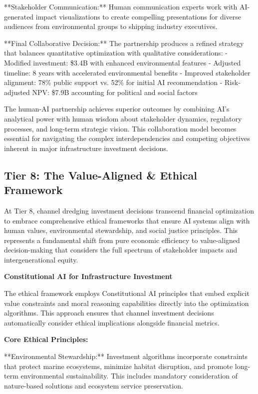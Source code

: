 \documentclass{article}
\begin{document}
**Stakeholder Communication:** Human communication experts work with AI-generated impact visualizations to create compelling presentations for diverse audiences from environmental groups to shipping industry executives.

**Final Collaborative Decision:**
The partnership produces a refined strategy that balances quantitative optimization with qualitative considerations:
- Modified investment: \$3.4B with enhanced environmental features
- Adjusted timeline: 8 years with accelerated environmental benefits
- Improved stakeholder alignment: 78\% public support vs. 52\% for initial AI recommendation
- Risk-adjusted NPV: \$7.9B accounting for political and social factors

The human-AI partnership achieves superior outcomes by combining AI's analytical power with human wisdom about stakeholder dynamics, regulatory processes, and long-term strategic vision. This collaboration model becomes essential for navigating the complex interdependencies and competing objectives inherent in major infrastructure investment decisions.

\subsection{Tier 8: The Value-Aligned \& Ethical Framework}

At Tier 8, channel dredging investment decisions transcend financial optimization to embrace comprehensive ethical frameworks that ensure AI systems align with human values, environmental stewardship, and social justice principles. This represents a fundamental shift from pure economic efficiency to value-aligned decision-making that considers the full spectrum of stakeholder impacts and intergenerational equity.

\textbf{Constitutional AI for Infrastructure Investment}

The ethical framework employs Constitutional AI principles that embed explicit value constraints and moral reasoning capabilities directly into the optimization algorithms. This approach ensures that channel investment decisions automatically consider ethical implications alongside financial metrics.

\textbf{Core Ethical Principles:}

**Environmental Stewardship:** Investment algorithms incorporate constraints that protect marine ecosystems, minimize habitat disruption, and promote long-term environmental sustainability. This includes mandatory consideration of nature-based solutions and ecosystem service preservation.
\end{document}
